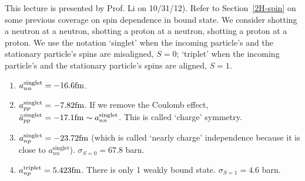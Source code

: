 \documentclass{school-22.101-notes}
\begin{document}
 \label{spin-scattering}
This lecture is presented by Prof. Li on 10/31/12). Refer to Section~\ref{2H-spin} on some previous coverage on spin dependence in bound state. We consider shotting a neutron at a neutron, shotting a proton at a neutron, shotting a proton at a proton. We use the notation `singlet' when the incoming particle's and the stationary particle's spins are misaligned, $S=0$; `triplet' when the incoming particle's and the stationary particle's spins are aligned, $S=1$. 
\begin{enumerate}
\item $\displaystyle a^{\mathrm{singlet}}_{nn} = -16.6 \mathrm{fm}$. 
\item $\displaystyle a^{\mathrm{singlet}}_{pp} = -7.82 \mathrm{fm}$. If we remove the Coulomb effect, $\displaystyle \tilde{a}^{\mathrm{singlet}}_{pp} = -17.1 \mathrm{fm} \sim a^{\mathrm{singlet}}_{nn}$. This is called `charge' symmetry. 
\item $\displaystyle a^{\mathrm{singlet}}_{np} = -23.72 \mathrm{fm}$ (which is called `nearly charge' independence because it is close to $a^{\mathrm{singlet}}_{nn}$). $\displaystyle \sigma_{S=0} = 67.8$ barn. 
\item $\displaystyle a^{\mathrm{triplet}}_{np} = 5.423 \mathrm{fm}$. There is only 1 weakly bound state. $\displaystyle \sigma_{S=1} = 4.6$ barn. 
\end{enumerate}
\end{document}
